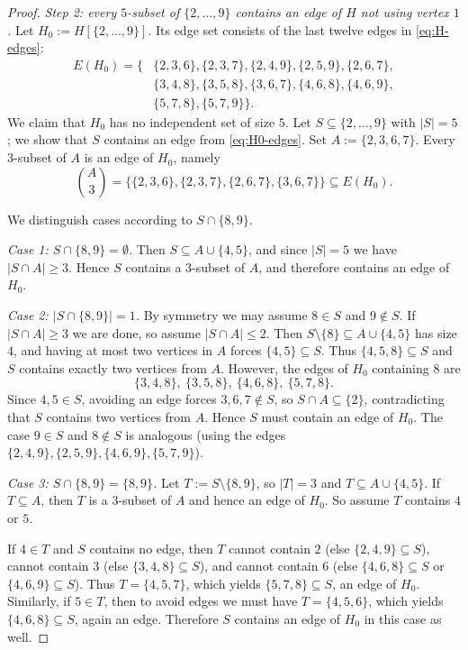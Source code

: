 \documentclass[11pt]{amsart}
\theoremstyle{definition}
\theoremstyle{remark}
\newcommand{\E}{E}
\begin{document}
\begin{proof}
\smallskip
\noindent\emph{Step 2: every $5$-subset of $\{2,\dots,9\}$ contains an edge of $H$ not using vertex $1$.}
Let $H_0:=H[\{2,\dots,9\}]$.
Its edge set consists of the last twelve edges in \eqref{eq:H-edges}:
\begin{equation}\label{eq:H0-edges}
\begin{aligned}
\E(H_0)=\{&
\{2,3,6\},\{2,3,7\},\{2,4,9\},\{2,5,9\},\{2,6,7\},\\
&
\{3,4,8\},\{3,5,8\},\{3,6,7\},\{4,6,8\},\{4,6,9\},\\
&
\{5,7,8\},\{5,7,9\}\}.
\end{aligned}
\end{equation}
We claim that $H_0$ has no independent set of size $5$.
Let $S\subseteq\{2,\dots,9\}$ with $|S|=5$; we show that $S$ contains an edge from \eqref{eq:H0-edges}.
Set $A:=\{2,3,6,7\}$.
Every $3$-subset of $A$ is an edge of $H_0$, namely
\[
\binom{A}{3}=\bigl\{\{2,3,6\},\{2,3,7\},\{2,6,7\},\{3,6,7\}\bigr\}\subseteq \E(H_0).
\]

We distinguish cases according to $S\cap\{8,9\}$.

\smallskip
\noindent\emph{Case 1: $S\cap\{8,9\}=\emptyset$.}
Then $S\subseteq A\cup\{4,5\}$, and since $|S|=5$ we have $|S\cap A|\ge 3$.
Hence $S$ contains a $3$-subset of $A$, and therefore contains an edge of $H_0$.

\smallskip
\noindent\emph{Case 2: $|S\cap\{8,9\}|=1$.}
By symmetry we may assume $8\in S$ and $9\notin S$.
If $|S\cap A|\ge 3$ we are done, so assume $|S\cap A|\le 2$.
Then $S\setminus\{8\}\subseteq A\cup\{4,5\}$ has size $4$, and having at most two vertices in $A$ forces $\{4,5\}\subseteq S$.
Thus $\{4,5,8\}\subseteq S$ and $S$ contains exactly two vertices from $A$.
However, the edges of $H_0$ containing $8$ are
\[
\{3,4,8\},\ \{3,5,8\},\ \{4,6,8\},\ \{5,7,8\}.
\]
Since $4,5\in S$, avoiding an edge forces $3,6,7\notin S$, so $S\cap A\subseteq\{2\}$, contradicting that $S$ contains two vertices from $A$.
Hence $S$ must contain an edge of $H_0$.
The case $9\in S$ and $8\notin S$ is analogous (using the edges $\{2,4,9\},\{2,5,9\},\{4,6,9\},\{5,7,9\}$).

\smallskip
\noindent\emph{Case 3: $S\cap\{8,9\}=\{8,9\}$.}
Let $T:=S\setminus\{8,9\}$, so $|T|=3$ and $T\subseteq A\cup\{4,5\}$.
If $T\subseteq A$, then $T$ is a $3$-subset of $A$ and hence an edge of $H_0$.
So assume $T$ contains $4$ or $5$.

If $4\in T$ and $S$ contains no edge, then $T$ cannot contain $2$ (else $\{2,4,9\}\subseteq S$), cannot contain $3$ (else $\{3,4,8\}\subseteq S$), and cannot contain $6$ (else $\{4,6,8\}\subseteq S$ or $\{4,6,9\}\subseteq S$).
Thus $T=\{4,5,7\}$, which yields $\{5,7,8\}\subseteq S$, an edge of $H_0$.
Similarly, if $5\in T$, then to avoid edges we must have $T=\{4,5,6\}$, which yields $\{4,6,8\}\subseteq S$, again an edge.
Therefore $S$ contains an edge of $H_0$ in this case as well.


\end{proof}
\end{document}
